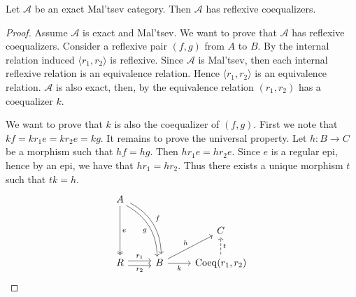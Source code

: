 \begin{mainbox}{}
    \begin{prop}\label{exact and Maltsev cat has reflexive coeq}
        Let $\mathcal{A}$ be an exact Mal'tsev category. Then $\mathcal{A}$ has reflexive coequalizers.
    \end{prop}
\end{mainbox}

\begin{subbox}{}
    \begin{proof}
        Assume $\mathcal{A}$ is exact and Mal'tsev. We want to prove that $\mathcal{A}$ has reflexive coequalizers. Consider a reflexive pair $(f,g)$ from $A$ to $B$. By  the internal relation induced $\langle r_1,r_2 \rangle$ is reflexive. Since $\mathcal{A}$ is Mal'tsev, then each internal reflexive relation is an equivalence relation. Hence $\langle r_1,r_2 \rangle$ is an equivalence relation. $\mathcal{A}$ is also exact, then, by  the equivalence relation $(r_1,r_2)$ has a coequalizer $k$.
        
        We want to prove that $k$ is also the coequalizer of $(f,g)$. First we note that $kf=kr_1e=kr_2e=kg$. It remains to prove the universal property. Let $h:B \to C$ be a morphism such that $hf=hg$. Then $hr_1e=hr_2e$. Since $e$ is a regular epi, hence by  an epi, we have that $hr_1=hr_2$. Thus there exists a unique morphism $t$ such that $tk=h$.
        \[
\begin{tikzcd}
A \arrow[dd, "e", two heads] \arrow[rdd, "f", bend left, shift left] \arrow[rdd, "g"', bend left, shift right] &                                   &                                                  \\
                                                                                                               &                                   & C                                                \\
R \arrow[r, "r_2"', shift right] \arrow[r, "r_1", shift left]                                                  & B \arrow[r, "k"'] \arrow[ru, "h"] & {\mathrm{Coeq}(r_1,r_2)} \arrow[u, "t"', dashed]
\end{tikzcd}
        \]
    \end{proof}    
\end{subbox}


